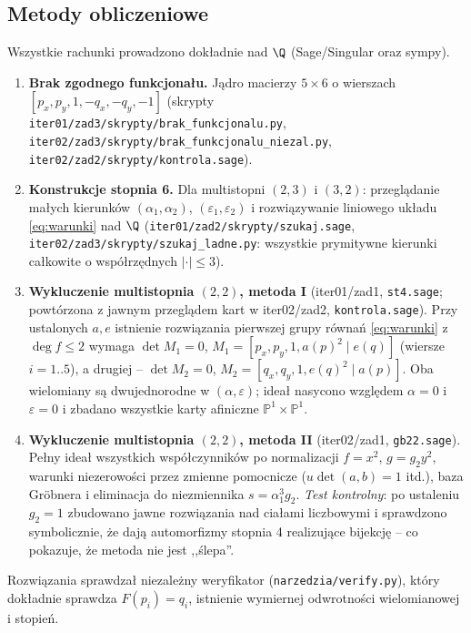 \subsection{Metody obliczeniowe}
Wszystkie rachunki prowadzono dokładnie nad $\Q$ (Sage/Singular oraz sympy).
\begin{enumerate}
\item \textbf{Brak zgodnego funkcjonału.} Jądro macierzy $5\times6$ o wierszach
$[p_x,p_y,1,-q_x,-q_y,-1]$ (skrypty \texttt{iter01/zad3/skrypty/brak\_funkcjonalu.py},
\texttt{iter02/zad3/skrypty/brak\_funkcjonalu\_niezal.py}, \texttt{iter02/zad2/skrypty/kontrola.sage}).
\item \textbf{Konstrukcje stopnia 6.} Dla multistopni $(2,3)$ i $(3,2)$: przeglądanie małych
kierunków $(\alpha_1,\alpha_2)$, $(\varepsilon_1,\varepsilon_2)$ i rozwiązywanie liniowego układu
\eqref{eq:warunki} nad $\Q$ (\texttt{iter01/zad2/skrypty/szukaj.sage},
\texttt{iter02/zad3/skrypty/szukaj\_ladne.py}: wszystkie prymitywne kierunki całkowite o
współrzędnych $|\cdot|\le3$).
\item \textbf{Wykluczenie multistopnia $(2,2)$, metoda I} (iter01/zad1, \texttt{st4.sage};
powtórzona z jawnym przeglądem kart w iter02/zad2, \texttt{kontrola.sage}). Przy ustalonych
$a,e$ istnienie rozwiązania pierwszej grupy równań \eqref{eq:warunki} z $\deg f\le2$ wymaga
$\det M_1=0$, $M_1=[p_x,p_y,1,a(p)^2\mid e(q)]$ (wiersze $i=1..5$), a drugiej -- $\det M_2=0$,
$M_2=[q_x,q_y,1,e(q)^2\mid a(p)]$. Oba wielomiany są dwujednorodne w $(\alpha,\varepsilon)$;
ideał nasycono względem $\alpha=0$ i $\varepsilon=0$ i zbadano wszystkie karty afiniczne
$\mathbb P^1\times\mathbb P^1$.
\item \textbf{Wykluczenie multistopnia $(2,2)$, metoda II} (iter02/zad1, \texttt{gb22.sage}).
Pełny ideał wszystkich współczynników po normalizacji $f=x^2$, $g=g_2y^2$, warunki niezerowości
przez zmienne pomocnicze ($u\det(a,b)=1$ itd.), baza Gröbnera i eliminacja do niezmiennika
$s=\alpha_1^3g_2$. \emph{Test kontrolny}: po ustaleniu $g_2=1$ zbudowano jawne rozwiązania nad
ciałami liczbowymi i sprawdzono symbolicznie, że dają automorfizmy stopnia 4 realizujące bijekcję
-- co pokazuje, że metoda nie jest ,,ślepa''.
\end{enumerate}
Rozwiązania sprawdzał niezależny weryfikator (\texttt{narzedzia/verify.py}), który dokładnie
sprawdza $F(p_i)=q_i$, istnienie wymiernej odwrotności wielomianowej i stopień.
